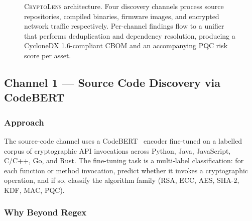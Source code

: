 \documentclass[sigconf,nonacm]{acmart}
\begin{document}
\begin{figure}[t]
\caption{\textsc{CryptoLens} architecture. Four discovery channels
  process source repositories, compiled binaries, firmware images, and
  encrypted network traffic respectively. Per-channel findings flow to
  a unifier that performs deduplication and dependency resolution,
  producing a CycloneDX 1.6-compliant CBOM and an accompanying PQC
  risk score per asset.}
\label{fig:framework}
\end{figure}

\subsection{Channel 1 --- Source Code Discovery via CodeBERT}

\subsubsection{Approach}

The source-code channel uses a CodeBERT~\cite{feng2020codebert}
encoder fine-tuned on a labelled corpus of cryptographic API
invocations across Python, Java, JavaScript, C/C++, Go, and Rust.
The fine-tuning task is a multi-label classification: for each function
or method invocation, predict whether it invokes a cryptographic
operation, and if so, classify the algorithm family
(RSA, ECC, AES, SHA-2, KDF, MAC, PQC).

\subsubsection{Why Beyond Regex}
\end{document}
